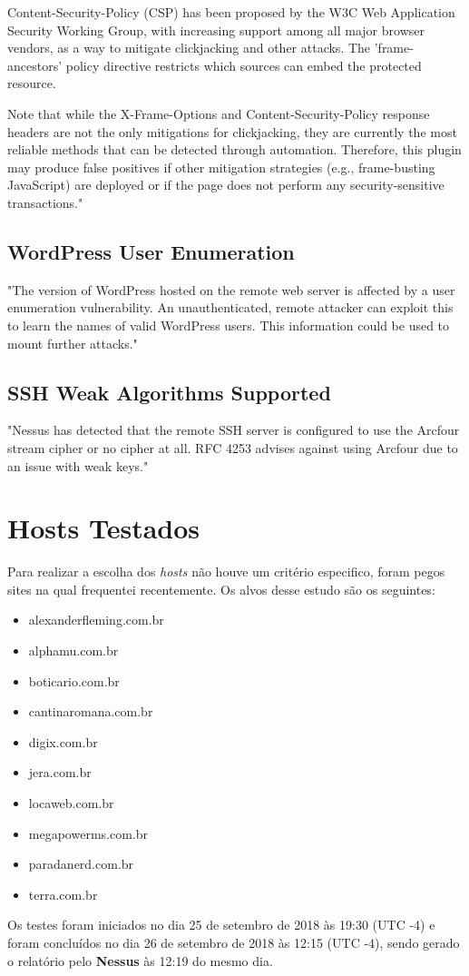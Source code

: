 \documentclass[
	12pt,				%
	openright,			%
	twoside,			%
	a4paper,			%
	english,			%
	french,				%
	spanish,			%
	brazil				%
	]{abntex2}
\begin{document}
Content-Security-Policy (CSP) has been proposed by the W3C Web
Application Security Working Group, with increasing support among
all major browser vendors, as a way to mitigate clickjacking and other
attacks. The 'frame-ancestors' policy directive restricts which
sources can embed the protected resource.

Note that while the X-Frame-Options and Content-Security-Policy
response headers are not the only mitigations for clickjacking, they
are currently the most reliable methods that can be detected through
automation. Therefore, this plugin may produce false positives if
other mitigation strategies (e.g., frame-busting JavaScript) are
deployed or if the page does not perform any security-sensitive
transactions."

\subsection{WordPress User Enumeration}
"The version of WordPress hosted on the remote web server is affected
by a user enumeration vulnerability. An unauthenticated, remote
attacker can exploit this to learn the names of valid WordPress users.
This information could be used to mount further attacks."

\subsection{SSH Weak Algorithms Supported}
"Nessus has detected that the remote SSH server is configured to use
the Arcfour stream cipher or no cipher at all. RFC 4253 advises
against using Arcfour due to an issue with weak keys."

\section{Hosts Testados}
Para realizar a escolha dos \textit{hosts} não houve um critério especifico, foram pegos sites na qual frequentei recentemente. Os alvos desse estudo são os seguintes:
\begin{itemize}
	\item alexanderfleming.com.br
	\item alphamu.com.br
	\item boticario.com.br
	\item cantinaromana.com.br
	\item digix.com.br
	\item jera.com.br
	\item locaweb.com.br
	\item megapowerms.com.br
	\item paradanerd.com.br
	\item terra.com.br
\end{itemize}
Os testes foram iniciados no dia 25 de setembro de 2018 às 19:30 (UTC -4) e foram concluídos no dia 26 de setembro de 2018 às 12:15 (UTC -4), sendo gerado o relatório pelo \textbf{Nessus} às 12:19 do mesmo dia.
\end{document}
